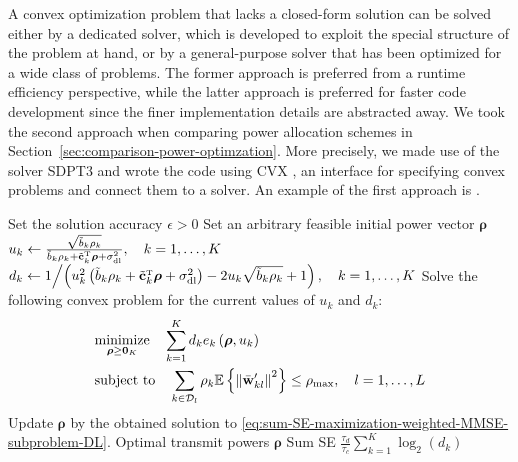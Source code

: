 \begin{remark} \label{remark:convex-solvers}
A convex optimization problem that lacks a closed-form solution can be solved either by a dedicated solver, which is developed to exploit the special structure of the problem at hand, or by a general-purpose solver that has been optimized for a wide class of problems. The former approach is preferred from a runtime efficiency perspective, while the latter approach is preferred for faster code development since the finer implementation details are abstracted away.
We took the second approach when comparing power allocation schemes in Section~\ref{sec:comparison-power-optimzation}.
More precisely, we made use of the solver SDPT3 \cite{SDPT3} and wrote the code using CVX \cite{cvx2014}, an interface for  specifying convex problems and connect them to a solver. 
An example of the first approach is \cite{Chakraborty2020a}.
\end{remark}


\begin{algorithm}
	\caption{Block coordinate descent algorithm for solving the sum SE maximization problem in \eqref{eq:sum-SE-maximization-downlink}.} \label{alg:sum-SE-downlink}
	\begin{algorithmic}[1]
		 Set the solution accuracy $\epsilon>0$
		\State Set an arbitrary feasible initial power vector $\boldsymbol{\rho}$
		\State $u_{k} \gets \frac{\sqrt{\tilde{b}_k\rho_k}}{\tilde{b}_k\rho_k+\tilde{\vect{c}}_k^{\Ttran}\boldsymbol{\rho}+\sigmaDL}, \quad k=1,\ldots,K$
		\State $d_k \gets 1\Big/ \!\left(u_{k}^2\left(\tilde{b}_k\rho_k+\tilde{\vect{c}}_k^{\Ttran}\boldsymbol{\rho}+\sigmaDL\right) -2u_{k}\sqrt{\tilde{b}_k\rho_k}+1\right), \quad k=1,\ldots,K$
			\State Solve the following convex problem for the current values of  $u_k$ and $d_k$:
		\begin{align}
		&\underset{\boldsymbol{\rho} \geq \mathbf{0}_K}{\textrm{minimize}} \quad \sum_{k=1}^Kd_{k}e_{k}\left(\boldsymbol{\rho},u_k\right) \label{eq:sum-SE-maximization-weighted-MMSE-subproblem-DL} \\
		&\hspace{0cm}\textrm{subject to} \quad \sum_{k\in \mathcal{D}_l}\rho_k\mathbb{E} \left\{ \left\| \bar{\mathbf{w}}_{kl}^{\prime} \right\|^2\right\}\leq \rho_{\textrm{max}}, \quad l=1,\ldots,L  \nonumber
		\end{align}
		\State Update $\boldsymbol{\rho}$ by the obtained solution to \eqref{eq:sum-SE-maximization-weighted-MMSE-subproblem-DL}.
		\EndWhile
		 Optimal transmit powers $\boldsymbol{\rho}$
			\State Sum SE $\frac{\tau_d}{\tau_c}\sum_{k=1}^K\log_2\left(d_k\right)$
	\end{algorithmic}
\end{algorithm}


